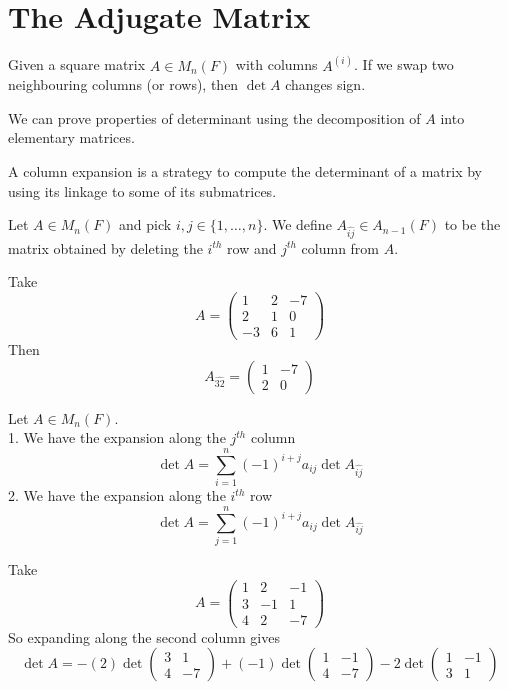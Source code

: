 \section{The Adjugate Matrix}
Given a square matrix $A\in M_n(F)$ with columns $A^{(i)}$.
If we swap two neighbouring columns (or rows), then $\det A$ changes sign.
\begin{remark}
    We can prove properties of determinant using the decomposition of $A$ into elementary matrices.
\end{remark}
A column expansion is a strategy to compute the determinant of a matrix by using its linkage to some of its submatrices.
\begin{definition}
    Let $A\in M_n(F)$ and pick $i,j\in\{1,\ldots,n\}$.
    We define $A_{\widehat{ij}}\in A_{n-1}(F)$ to be the matrix obtained by deleting the $i^{th}$ row and $j^{th}$ column from $A$.
\end{definition}
\begin{example}
    Take
    $$A=\begin{pmatrix}
        1&2&-7\\
        2&1&0\\
        -3&6&1
    \end{pmatrix}$$
    Then
    $$A_{\widehat{32}}=\begin{pmatrix}
        1&-7\\
        2&0
    \end{pmatrix}$$
\end{example}
\begin{lemma}
    Let $A\in M_n(F)$.\\
    1. We have the expansion along the $j^{th}$ column
    $$\det A=\sum_{i=1}^n(-1)^{i+j}a_{ij}\det A_{\widehat{ij}}$$
    2. We have the expansion along the $i^{th}$ row
    $$\det A=\sum_{j=1}^n(-1)^{i+j}a_{ij}\det A_{\widehat{ij}}$$
\end{lemma}
\begin{example}
    Take
    $$A=\begin{pmatrix}
        1&2&-1\\
        3&-1&1\\
        4&2&-7
    \end{pmatrix}$$
    So expanding along the second column gives
    $$\det A=-(2)\det\begin{pmatrix}
        3&1\\
        4&-7
    \end{pmatrix}+(-1)\det\begin{pmatrix}
        1&-1\\
        4&-7
    \end{pmatrix}-2\det\begin{pmatrix}
        1&-1\\
        3&1
    \end{pmatrix}$$
\end{example}
